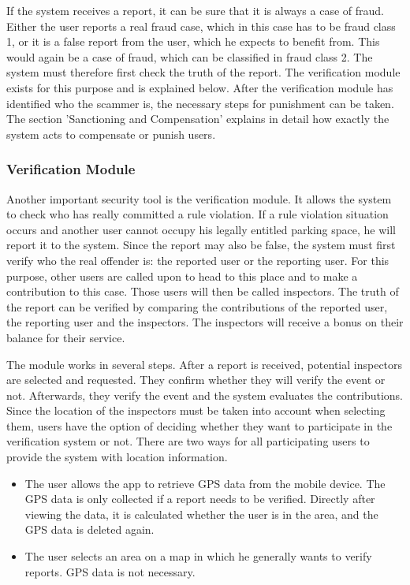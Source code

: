 \documentclass[
a4paper,     %
titlepage,   %
14pt         %
]{scrartcl}  %
\theoremstyle{mystyle}
\begin{document}
If the system receives a report, it can be sure that it is always a case of fraud. Either the user reports a real fraud case, which in this case has to be fraud class 1, or it is a false report from the user, which he expects to benefit from. This would again be a case of fraud, which can be classified in fraud class 2. The system must therefore first check the truth of the report. The verification module exists for this purpose and is explained below. After the verification module has identified who the scammer is, the necessary steps for punishment can be taken. The section 'Sanctioning and Compensation' explains in detail how exactly the system acts to compensate or punish users.

\subsubsection{Verification Module} Another important security tool is the verification module. It allows the system to check who has really committed a rule violation. If a rule violation situation occurs and another user cannot occupy his legally entitled parking space, he will report it to the system. Since the report may also be false, the system must first verify who the real offender is: the reported user or the reporting user. For this purpose, other users are called upon to head to this place and to make a contribution to this case. Those users will then be called inspectors. The truth of the report can be verified by comparing the contributions of the reported user, the reporting user and the inspectors. The inspectors will receive a bonus on their balance for their service.

The module works in several steps. After a report is received, potential inspectors are selected and requested. They confirm whether they will verify the event or not. Afterwards, they verify the event and the system evaluates the contributions. \\

Since the location of the inspectors must be taken into account when selecting them, users have the option of deciding whether they want to participate in the verification system or not. There are two ways for all participating users to provide the system with location information. 
\begin{itemize}
\item The user allows the app to retrieve GPS data from the mobile device. The GPS data is only collected if a report needs to be verified. Directly after viewing the data, it is calculated whether the user is in the area, and the GPS data is deleted again.
\item The user selects an area on a map in which he generally wants to verify reports. GPS data is not necessary.
\end{itemize}
\end{document}
